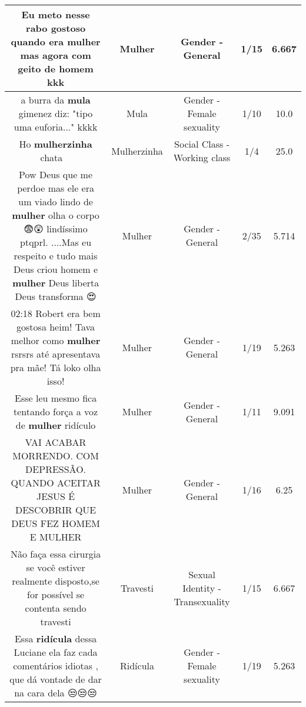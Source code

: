 \documentclass[11pt]{article}
\newlength\mylength
\begin{document}
\begin{center}
\begin{longtable}{|C{.65\mylength}|C{.30\mylength}|C{.12\mylength}|C{.12\mylength}|C{.12\mylength}|}
  \small Eu meto nesse rabo gostoso quando era \textbf{mulher} mas agora com geito de homem kkk\normalsize   & Mulher & Gender - General & 1/15 & 6.667 \\  \hline
  \small a burra da \textbf{mula} gimenez diz: "tipo uma euforia..." kkkk\normalsize   & Mula & Gender - Female sexuality & 1/10 & 10.0 \\  \hline
  \small Ho \textbf{mulherzinha} chata 🤦‍♀️\normalsize   & Mulherzinha & Social Class - Working class & 1/4 & 25.0 \\  \hline
  \small Pow Deus que me perdoe mas ele era um viado lindo de \textbf{mulher} olha o corpo 😨😲 lindíssimo ptqprl. ....Mas eu respeito e tudo mais Deus criou homem e \textbf{mulher}   Deus liberta Deus transforma 😍\normalsize   & Mulher & Gender - General & 2/35 & 5.714 \\  \hline
  \small 02:18 Robert era bem gostosa heim! Tava melhor como \textbf{mulher} rsrsrs até apresentava pra mãe! Tá loko olha isso!\normalsize   & Mulher & Gender - General & 1/19 & 5.263 \\  \hline
  \small Esse leu mesmo fica tentando força a voz de \textbf{mulher} ridículo\normalsize   & Mulher & Gender - General & 1/11 & 9.091 \\  \hline
  \small VAI ACABAR MORRENDO. COM DEPRESSÃO. QUANDO ACEITAR JESUS É DESCOBRIR QUE DEUS FEZ HOMEM E MULHER\normalsize   & Mulher & Gender - General & 1/16 & 6.25 \\  \hline
  \small Não faça essa cirurgia se você  estiver realmente disposto,se for possível se contenta sendo travesti\normalsize   & Travesti & Sexual Identity - Transexuality & 1/15 & 6.667 \\  \hline
  \small Essa \textbf{ridícula} dessa Luciane ela faz cada comentários idiotas , que dá vontade de dar na cara dela 😒😒😒\normalsize   & Ridícula & Gender - Female sexuality & 1/19 & 5.263 \\  \hline

\end{longtable}
\end{center}
\end{document}
